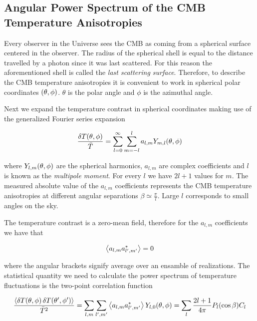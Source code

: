 \subsection{Angular Power Spectrum of the CMB Temperature Anisotropies}

Every observer in the Universe sees the CMB as coming from a spherical
surface centered in the observer. The radius of the spherical shell is
equal to the distance travelled by a photon since it was last scattered.
For this reason the aforementioned shell is called the \emph{last
scattering surface}. Therefore, to describe the CMB temperature
anisotropies it is convenient to work in spherical polar
coordinates $\qty(\theta,\phi)$. $\theta$ is the polar angle and $\phi$ is the
azimuthal angle. 

Next we expand the temperature contrast in spherical coordinates making use
of the generalized Fourier series expansion

\begin{equation}
        \frac{\var{T\qty(\theta,\phi)}}{\bar T} =
        \sum^\infty_{l=0}\sum^l_{m=-l} a_{l,m}
        Y_{m,l}\qty(\theta,\phi)
\end{equation}

where $Y_{l,m}\qty(\theta,\phi)$ are the spherical harmonics, $a_{l,m}$ are
complex coefficients and $l$ is known as the \emph{multipole moment}.
For every $l$ we have $2l + 1$ values for $m$.
The measured absolute value of the $a_{l,m}$ coefficients represents the
CMB temperature anisotropies at different angular separations $\beta \simeq
\frac{\pi}{l}$. Large $l$ corresponds to small angles on the sky.

The temperature contrast is a zero-mean field, therefore for the $a_{l,m}$
coefficients we have that

\begin{equation}
        \expval{a_{l,m} a^*_{l',m'}} = 0
\end{equation}

where the angular brackets signify average over an ensamble of
realizations. The statistical quantity we need to calculate the power
spectrum of temperature fluctuations is the two-point correlation function

\begin{equation}
        \frac{\expval{\var{T\qty(\theta,\phi)} \var{T\qty(\theta',\phi')}}}
        {\bar T^2} = 
        \sum_{l,m}\sum_{l',m'} \expval{a_{l,m} a^*_{l',m'}}
        Y_{l,0}\qty(\theta,\phi) =
        \sum_l \frac{2l + 1}{4\pi} P_l\qty(\cos \beta) C_l 
\end{equation}

